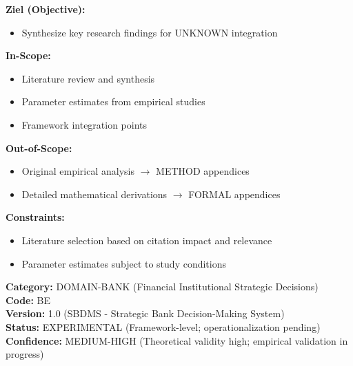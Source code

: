 \documentclass[11pt]{article}
\begin{document}
\begin{tcolorbox}[
    colback=orange!5!white,
    colframe=orange!75!black,
    title={\textbf{Appendix Scope: Ziel / In-Scope / Out-of-Scope / Constraints}},
    fonttitle=\bfseries
]

\textbf{Ziel (Objective):}
\begin{itemize}[nosep]
    \item Synthesize key research findings for UNKNOWN integration
\end{itemize}

\textbf{In-Scope:}
\begin{itemize}[nosep]
    \item Literature review and synthesis
    \item Parameter estimates from empirical studies
    \item Framework integration points
\end{itemize}

\textbf{Out-of-Scope:}
\begin{itemize}[nosep]
    \item Original empirical analysis $\rightarrow$ METHOD appendices
    \item Detailed mathematical derivations $\rightarrow$ FORMAL appendices
\end{itemize}

\textbf{Constraints:}
\begin{itemize}[nosep]
    \item Literature selection based on citation impact and relevance
    \item Parameter estimates subject to study conditions
\end{itemize}

\end{tcolorbox}

\begin{center}
\colorbox{lightcyan!30}{\begin{minipage}{0.95\textwidth}
\textbf{Category:} DOMAIN-BANK (Financial Institutional Strategic Decisions) \\
\textbf{Code:} BE \\
\textbf{Version:} 1.0 (SBDMS - Strategic Bank Decision-Making System) \\
\textbf{Status:} EXPERIMENTAL (Framework-level; operationalization pending) \\
\textbf{Confidence:} MEDIUM-HIGH (Theoretical validity high; empirical validation in progress)
\end{minipage}}
\end{center}
\end{document}

